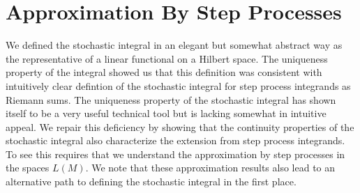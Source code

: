 \section{Approximation By Step Processes}

We defined the stochastic integral in an elegant but somewhat abstract way as the representative of a linear functional on a Hilbert space.  The uniqueness property of the integral showed us that this definition was consistent with intuitively clear defintion of the stochastic integral for step process integrands as Riemann sums.  The uniqueness property of the stochastic integral has shown itself to be a very useful technical tool but is lacking somewhat in intuitive appeal.  We repair this deficiency by showing that the continuity properties of the stochastic integral also characterize the extension from step process integrands.  To see this requires that we understand the approximation by step processes in the spaces $L(M)$.  We note that these approximation results also lead to an alternative path to defining the stochastic integral in the first place.  

